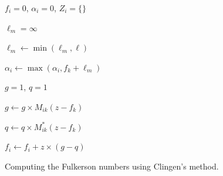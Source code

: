 \documentclass[12pt]{article}
\def\P{\mathbb{P}}
\begin{document}
\begin{algorithm}	
	
	{	
		$f_i = 0$, $\alpha_i = 0$, $Z_i = \{\}$
		
		{
			$\ell_m = \infty$
			
			{
				$\ell_m \leftarrow \min(\ell_m, \ell)$
				
			}
			
			$\alpha_i \leftarrow \max(\alpha_i, f_k + \ell_m)$
		}
		
		
		{
			{
				$g = 1$, $q = 1$
				
				{
					$g \leftarrow g \times M_{ik}(z - f_k)$
					
					$q \leftarrow q \times M_{ik}^{*}(z - f_k)$
				}
				
				$f_i \leftarrow f_i + z \times (g - q)$				
			}
		}		
	}	
	\caption{Computing the Fulkerson numbers using Clingen's method.}
	\label{alg.fulkerson}
\end{algorithm} 


\end{document}
